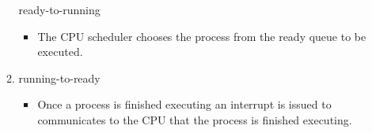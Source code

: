 \documentclass{article} %
\begin{document}
\begin{enumerate}
\begin{enumerate}[label=(\alph*)]
                        ready-to-running
                \begin{itemize}
                    \item 
                        The CPU scheduler chooses the process from the 
                        ready queue to be executed.
                \end{itemize}
                \hfill
            \item
                        running-to-ready
                \begin{itemize}
                    \item 
                        Once a process is finished executing an interrupt is issued
                        to communicates to the CPU that the process is finished 
                        executing.
                \end{itemize}
                \hfill
        \end{enumerate}

\end{enumerate}
\end{document}
